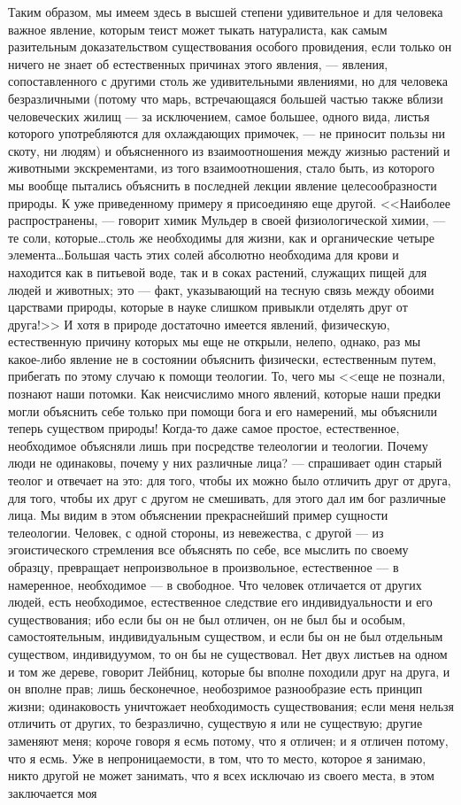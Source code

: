 \documentclass[12pt]{article}
\begin{document}
Таким образом, мы имеем здесь в высшей степени удивительное и для человека важное явление, которым теист может тыкать натуралиста, как самым разительным доказательством существования особого провидения, если только он ничего не знает об естественных причинах этого явления, --- явления, сопоставленного с другими столь же удивительными явлениями, но для человека безразличными (потому что марь, встречающаяся большей частью также вблизи человеческих жилищ --- за исключением, самое большее, одного вида, листья которого употребляются для охлаждающих примочек, --- не приносит пользы ни скоту, ни людям) и объясненного из взаимоотношения между жизнью растений и животными экскрементами, из того взаимоотношения, стало быть, из которого мы вообще пытались объяснить в последней лекции явление целесообразности природы. К уже приведенному примеру я присоединяю еще другой. <<Наиболее распространены, --- говорит химик Мульдер в своей физиологической химии, --- те соли, которые\dots столь же необходимы для жизни, как и органические четыре элемента\dots Большая часть этих солей абсолютно необходима для крови и находится как в питьевой воде, так и в соках растений, служащих пищей для людей и животных; это --- факт, указывающий на тесную связь между обоими царствами природы, которые в науке слишком привыкли отделять друг от друга!>> И хотя в природе достаточно имеется явлений, физическую, естественную причину которых мы еще не открыли, нелепо, однако, раз мы какое-либо явление не в состоянии объяснить физически, естественным путем, прибегать по этому случаю к помощи теологии. То, чего мы <<еще не познали, познают наши потомки. Как неисчислимо много явлений, которые наши предки могли объяснить себе только при помощи бога и его намерений, мы объяснили теперь существом природы! Когда-то даже самое простое, естественное, необходимое объясняли лишь при посредстве телеологии и теологии. Почему люди не одинаковы, почему у них различные лица? --- спрашивает один старый теолог и отвечает на это: для того, чтобы их можно было отличить друг от друга, для того, чтобы их друг с другом не смешивать, для этого дал им бог различные лица. Мы видим в этом объяснении прекраснейший пример сущности телеологии. Человек, с одной стороны, из невежества, с другой --- из эгоистического стремления все объяснять по себе, все мыслить по своему образцу, превращает непроизвольное в произвольное, естественное --- в намеренное, необходимое --- в свободное. Что человек отличается от других людей, есть необходимое, естественное следствие его индивидуальности и его существования; ибо если бы он не был отличен, он не был бы и особым, самостоятельным, индивидуальным существом, и если бы он не был отдельным существом, индивидуумом, то он бы не существовал. Нет двух листьев на одном и том же дереве, говорит Лейбниц, которые бы вполне походили друг на друга, и он вполне прав; лишь бесконечное, необозримое разнообразие есть принцип жизни; одинаковость уничтожает необходимость существования; если меня нельзя отличить от других, то безразлично, существую я или не существую; другие заменяют меня; короче говоря я есмь потому, что я отличен; и я отличен потому, что я есмь. Уже в непроницаемости, в том, что то место, которое я занимаю, никто другой не может занимать, что я всех исключаю из своего места, в этом заключается моя 
\end{document}
